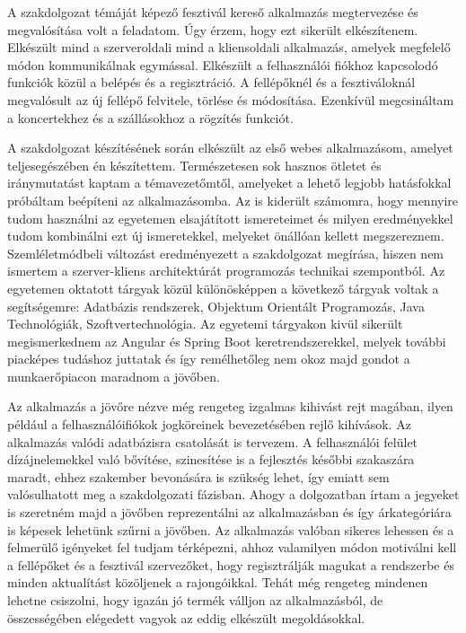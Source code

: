 
A szakdolgozat témáját képező fesztivál kereső alkalmazás megtervezése és megvalósítása volt a feladatom. Úgy érzem, hogy ezt sikerült elkészítenem. Elkészült mind a szerveroldali  mind a kliensoldali alkalmazás, amelyek megfelelő módon kommunikálnak egymással. Elkészült a felhasználói fiókhoz kapcsolodó funkciók közül a belépés és a regisztráció. A fellépőknél és a fesztiváloknál megvalósult az új fellépő felvitele, törlése és módosítása. Ezenkívül megcsináltam a koncertekhez  és a szállásokhoz a rögzítés funkciót.

A szakdolgozat készítésének során elkészült az első webes alkalmazásom, amelyet teljesegészében én készítettem. Természetesen sok hasznos ötletet és iránymutatást kaptam a témavezetőmtől, amelyeket a lehető legjobb hatásfokkal próbáltam beépíteni az alkalmazásomba. Az is kiderült számomra, hogy mennyire tudom használni az egyetemen elsajátított ismereteimet és milyen eredményekkel tudom kombinálni ezt új ismeretekkel, melyeket önállóan kellett megszereznem. Szemléletmódbeli változást eredményezett a szakdolgozat megírása, hiszen nem ismertem a szerver-kliens architektúrát programozás technikai szempontból. Az egyetemen oktatott tárgyak közül  különösképpen a következő tárgyak voltak a segítségemre:  Adatbázis rendszerek, Objektum Orientált Programozás,  Java Technológiák, Szoftvertechnológia. Az egyetemi tárgyakon kivül sikerült megismerkednem az Angular és Spring Boot keretrendszerekkel, melyek további piacképes tudáshoz juttatak és így remélhetőleg nem okoz majd gondot a munkaerőpiacon maradnom a jövőben.

Az alkalmazás a jövőre nézve még rengeteg izgalmas kihivást rejt magában, ilyen például a felhasználóifiókok jogköreinek bevezetésében rejlő kihívások. Az alkalmazás valódi adatbázisra csatolását is tervezem. A felhasználói felület dízájnelemekkel való bővítése, szinesítése is a fejlesztés későbbi szakaszára maradt, ehhez szakember bevonására is szükség lehet, így emiatt sem valósulhatott meg a szakdolgozati fázisban. Ahogy a dolgozatban írtam a jegyeket is szeretném majd a jövőben reprezentálni az alkalmazásban és így árkategóriára is képesek lehetünk szűrni a jövőben.  Az alkalmazás valóban sikeres lehessen és a felmerülő igényeket fel tudjam térképezni, ahhoz valamilyen módon motiválni kell a fellépőket és a fesztivál szervezőket, hogy regisztrálják magukat a rendszerbe és minden aktualítást közöljenek a rajongóikkal. Tehát még rengeteg mindenen lehetne csiszolni, hogy igazán jó termék válljon az alkalmazásból, de összességében elégedett vagyok az eddig elkészült megoldásokkal.